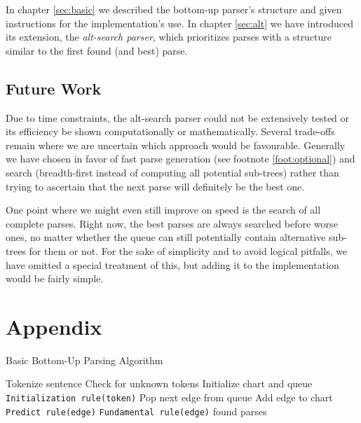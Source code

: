 \documentclass[11pt, titlepage, a4paper]{scrartcl}		%
\newcommand{\xmas}[1]{alt-search#1}
\begin{document}
In chapter \ref{sec:basic} we described the bottom-up parser's structure and given instructions for the implementation's use. In chapter \ref{sec:alt} we have introduced its extension, the \textit{\xmas{} parser}, which prioritizes parses with a structure similar to the first found (and best) parse.

\subsection{Future Work}
Due to time constraints, the \xmas{} parser could not be extensively tested or its efficiency be shown computationally or mathematically. Several trade-offs remain where we are uncertain which approach would be favourable. Generally we have chosen in favor of fast parse generation (see footnote \ref{foot:optional}) and search (breadth-first instead of computing all potential sub-trees) rather than trying to ascertain that the next parse will definitely be the best one.

One point where we might even still improve on speed is the search of all complete parses. Right now, the best parses are always searched before worse ones, no matter whether the queue can still potentially contain alternative sub-trees for them or not.
For the sake of simplicity and to avoid logical pitfalls, we have omitted a special treatment of this, but adding it to the implementation would be fairly simple.

\appendix
\clearpage
\section{Appendix}

\begin{algorithm}
\caption{Basic Bottom-Up Parsing Algorithm}
\label{alg:basic}
\begin{algorithmic}[1]
\STATE Tokenize sentence
\STATE Check for unknown tokens
\STATE Initialize chart and queue
    \STATE \texttt{Initialization rule(token)}
\ENDFOR
{} \label{alg:basic:parse:start}
    \STATE Pop next edge from queue
    \STATE Add edge to chart
        \STATE \texttt{Predict rule(edge)}
    \ENDIF
    \STATE \texttt{Fundamental rule(edge)}
\ENDWHILE  \label{alg:basic:parse:end}
\RETURN found parses
\end{algorithmic}
\end{algorithm}
\end{document}
